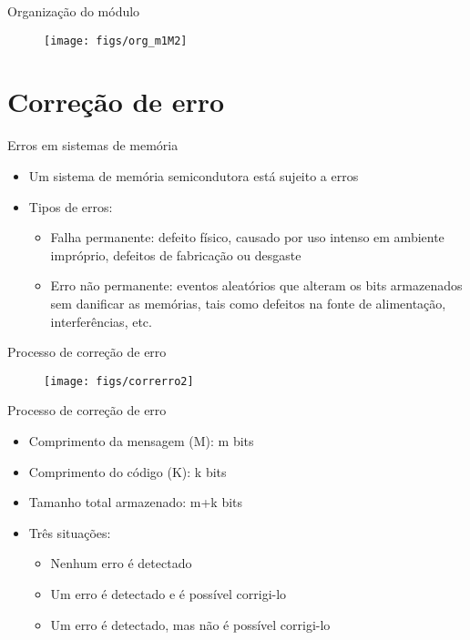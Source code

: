 \begin{slide}{Organização do módulo}
\begin{figure}[h]
         \centering
         \texttt{[image: figs/org\_m1M2]}
      \end{figure}
\end{slide}

\section[slide=true]{Correção de erro}

\begin{slide}{Erros em sistemas de memória}
\begin{itemize}
   \item Um sistema de memória semicondutora está sujeito a erros\pause
   \item Tipos de erros: \pause
   \begin{itemize}
      \item Falha permanente: defeito físico, causado por uso intenso em ambiente impróprio, defeitos de fabricação ou desgaste \pause
      \item Erro não permanente: eventos aleatórios que alteram os bits armazenados sem danificar as memórias, tais como defeitos na fonte de alimentação, interferências, etc.
   \end{itemize}
\end{itemize}
\end{slide}

\begin{slide}{Processo de correção de erro}
\begin{figure}[h]
         \centering
         \texttt{[image: figs/correrro2]}
      \end{figure}
\end{slide}

\begin{slide}{Processo de correção de erro}
\begin{itemize}
   \item Comprimento da mensagem (M): m bits
   \item Comprimento do código (K): k bits
   \item Tamanho total armazenado: m+k bits\pause
   \item Três situações:\pause
   \begin{itemize}
      \item Nenhum erro é detectado\pause
      \item Um erro é detectado e é possível corrigi-lo\pause
      \item Um erro é detectado, mas não é possível corrigi-lo
   \end{itemize}
\end{itemize}
\end{slide}

